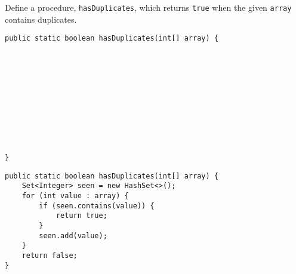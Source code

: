 \begin{blocksection}
\question Define a procedure, \lstinline$hasDuplicates$, which returns
\lstinline$true$ when the given \lstinline$array$ contains duplicates.

\ifprintanswers\else
\begin{lstlisting}
public static boolean hasDuplicates(int[] array) {











}
\end{lstlisting}
\fi

\begin{solution}
\begin{lstlisting}
public static boolean hasDuplicates(int[] array) {
    Set<Integer> seen = new HashSet<>();
    for (int value : array) {
        if (seen.contains(value)) {
            return true;
        }
        seen.add(value);
    }
    return false;
}
\end{lstlisting}
\end{solution}
\end{blocksection}
